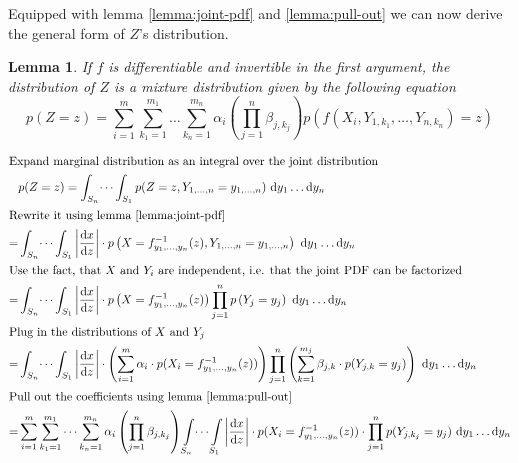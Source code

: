 \documentclass[11pt,a4paper]{book}
\newtheorem{lemma}{Lemma}
\begin{document}
Equipped with lemma \ref{lemma:joint-pdf} and \ref{lemma:pull-out} we can now
derive the general form of $Z$'s distribution.

\begin{lemma}
  \label{lemma:mixture}
  If $f$ is differentiable and invertible in the first argument, the
  distribution of $Z$ is a mixture distribution given by the following equation
  \begin{equation*}
    p(Z = z) = \sum_{i = 1}^{m} \sum_{k_{1} = 1}^{m_{1}} \dots \sum_{k_{n} = 1}^{m_{n}} \alpha_{i} \left( \prod_{j = 1}^{n} \beta_{j,k_{j}} \right) p(f(X_{i}, Y_{1,k_{1}}, \dots, Y_{n,k_{n}}) = z)
  \end{equation*}
\end{lemma}
\begin{proof2}
  \begin{align*}
    \intertext{Expand marginal distribution as an integral over the joint distribution}
    & p(Z = z) = \int_{S_{n}} \dots \int_{S_{1}} p(Z = z, Y_{1, \dots, n} = y_{1, \dots, n})~\mathrm{d}y_{1}\dots \mathrm{d}y_{n}\\
    \intertext{Rewrite it using lemma \ref{lemma:joint-pdf}}
    = & \int_{S_{n}} \dots \int_{S_{1}} \left| \frac{\mathrm{d}x}{\mathrm{d}z} \right| \cdot p\left(X = f_{y_{1}, \dots, y_{n}}^{-1}(z), Y_{1, \dots, n} = y_{1, \dots, n}\right)~\mathrm{d}y_{1}\dots \mathrm{d}y_{n}\\
    \intertext{Use the fact, that $X$ and $Y_{i}$ are independent, i.e. that the joint PDF can be factorized}
    = & \int_{S_{n}} \dots \int_{S_{1}} \left| \frac{\mathrm{d}x}{\mathrm{d}z} \right| \cdot p\left(X = f_{y_{1}, \dots, y_{n}}^{-1}(z)\right) \prod_{j = 1}^{n} p\left(Y_{j} = y_{j}\right)~\mathrm{d}y_{1}\dots \mathrm{d}y_{n}\\
    \intertext{Plug in the distributions of $X$ and $Y_{j}$}
    = & \int_{S_{n}} \dots \int_{S_{1}} \left| \frac{\mathrm{d}x}{\mathrm{d}z} \right| \cdot \left(\sum_{i = 1}^{m} \alpha_{i} \cdot p(X_{i} = f_{y_{1}, \dots, y_{n}}^{-1}(z))\right) \prod_{j = 1}^{n} \left(\sum_{k = 1}^{m_{j}} \beta_{j,k} \cdot p(Y_{j,k} = y_{j})\right)~\mathrm{d}y_{1}\dots \mathrm{d}y_{n}\\
    \intertext{Pull out the coefficients using lemma \ref{lemma:pull-out}}
    = & \sum_{i = 1}^{m} \sum_{k_{1} = 1}^{m_{1}} \dots \sum_{k_{n} = 1}^{m_{n}} \alpha_{i} \left( \prod_{j = 1}^{n} \beta_{j,k_{j}} \right) \int\limits_{S_{n}} \dots \int\limits_{S_{1}} \left| \frac{\mathrm{d}x}{\mathrm{d}z} \right| \cdot p(X_{i} = f_{y_{1}, \dots, y_{n}}^{-1}(z)) \cdot \prod_{j = 1}^{n} p(Y_{j,k_{j}} = y_{j})~\mathrm{d}y_{1}\dots \mathrm{d}y_{n}\\

\end{align*}
\end{proof2}
\end{document}
